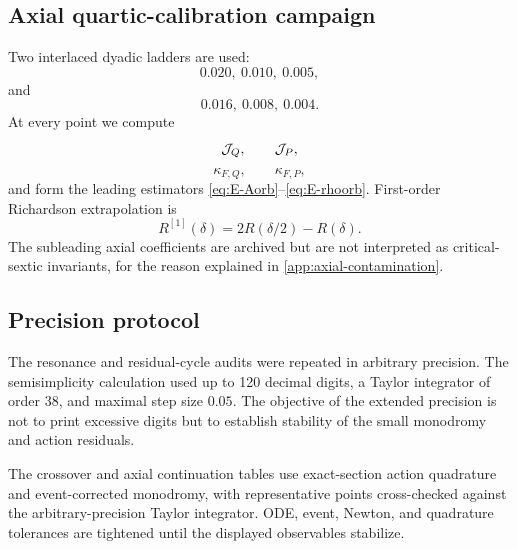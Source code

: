 \subsection{Axial quartic-calibration campaign}

Two interlaced dyadic ladders are used:
\[
0.020,\ 0.010,\ 0.005,
\]
and
\[
0.016,\ 0.008,\ 0.004.
\]
At every point we compute
\[
\mathcal{J}_Q,\qquad \mathcal{J}_P,
\]
\[
\kappa_{F,Q},\qquad \kappa_{F,P},
\]
and form the leading estimators \eqref{eq:E-Aorb}--\eqref{eq:E-rhoorb}.  First-order Richardson extrapolation is
\[
\boxed{
R^{[1]}(\delta)
=
2R(\delta/2)-R(\delta).
}
\]
The subleading axial coefficients are archived but are not interpreted as critical-sextic invariants, for the reason explained in \cref{app:axial-contamination}.

\subsection{Precision protocol}

The resonance and residual-cycle audits were repeated in arbitrary precision.  The semisimplicity calculation used up to 120 decimal digits, a Taylor integrator of order 38, and maximal step size \(0.05\).  The objective of the extended precision is not to print excessive digits but to establish stability of the small monodromy and action residuals.

The crossover and axial continuation tables use exact-section action quadrature and event-corrected monodromy, with representative points cross-checked against the arbitrary-precision Taylor integrator.  ODE, event, Newton, and quadrature tolerances are tightened until the displayed observables stabilize.
